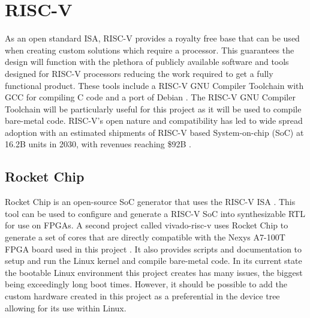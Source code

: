 \section{RISC\mbox{-}V}
As an open standard ISA, RISC\mbox{-}V provides a royalty free base that can be used when creating custom solutions which require a processor. This guarantees the design will function with the plethora of publicly available software and tools designed for RISC\mbox{-}V processors reducing the work required to get a fully functional product. These tools include a RISC\mbox{-}V GNU Compiler Toolchain with GCC for compiling C code \cite{RISCVGNU} and a port of Debian \cite{DEBIANRISCV}. The RISC\mbox{-}V GNU Compiler Toolchain will be particularly useful for this project as it will be used to compile bare\mbox{-}metal code. RISC\mbox{-}V’s open nature and compatibility has led to wide spread adoption with an estimated shipments of RISC\mbox{-}V based System\mbox{-}on\mbox{-}chip (SoC) at 16.2B units in 2030, with revenues reaching \$92B \cite{SHDGROUP}.

\subsection{Rocket Chip}
Rocket Chip is an open\mbox{-}source SoC generator that uses the RISC\mbox{-}V ISA \cite{Asanović:EECS-2016-17}. This tool can be used to configure and generate a RISC\mbox{-}V SoC into synthesizable RTL for use on FPGAs. A second project called vivado\mbox{-}risc\mbox{-}v uses Rocket Chip to generate a set of cores that are directly compatible with the Nexys A7\mbox{-}100T FPGA board used in this project \cite{VIVADORISCV}. It also provides scripts and documentation to setup and run the Linux kernel and compile bare\mbox{-}metal code. In its current state the bootable Linux environment this project creates has many issues, the biggest being exceedingly long boot times. However, it should be possible to add the custom hardware created in this project as a preferential in the device tree allowing for its use within Linux.

